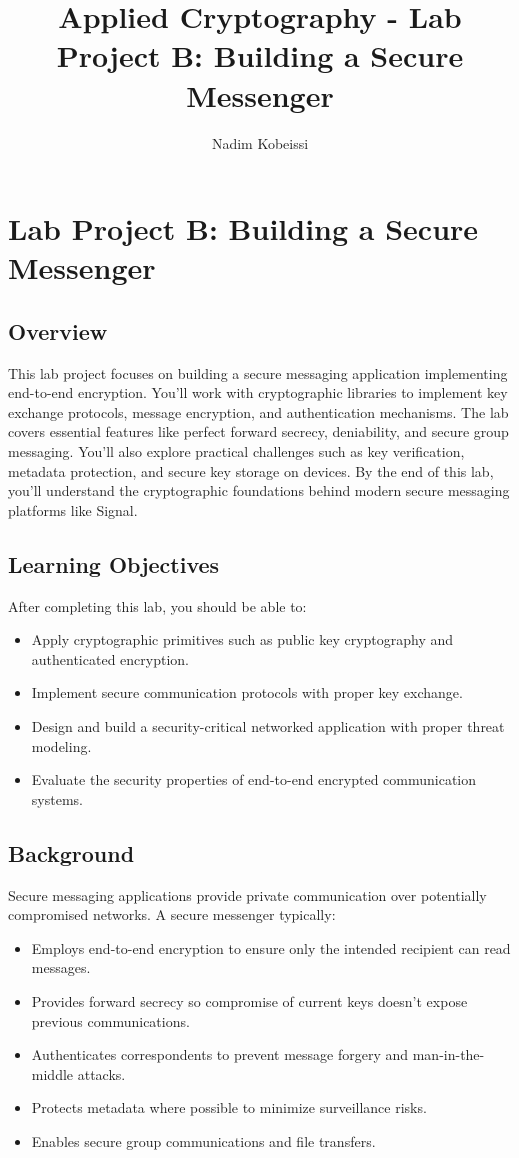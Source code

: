 \documentclass[10pt,a4paper,american]{exam}
\title{Applied Cryptography - Lab Project B: Building a Secure Messenger}
\author{Nadim Kobeissi}
\begin{document}
\classhandoutheader
\section*{Lab Project B: Building a Secure Messenger}

\subsection*{Overview}
This lab project focuses on building a secure messaging application implementing end-to-end encryption. You'll work with cryptographic libraries to implement key exchange protocols, message encryption, and authentication mechanisms. The lab covers essential features like perfect forward secrecy, deniability, and secure group messaging. You'll also explore practical challenges such as key verification, metadata protection, and secure key storage on devices. By the end of this lab, you'll understand the cryptographic foundations behind modern secure messaging platforms like Signal.

\subsection*{Learning Objectives}
After completing this lab, you should be able to:
\begin{itemize}
	\item Apply cryptographic primitives such as public key cryptography and authenticated encryption.
	\item Implement secure communication protocols with proper key exchange.
	\item Design and build a security-critical networked application with proper threat modeling.
	\item Evaluate the security properties of end-to-end encrypted communication systems.
\end{itemize}

\subsection*{Background}
Secure messaging applications provide private communication over potentially compromised networks. A secure messenger typically:
\begin{itemize}
	\item Employs end-to-end encryption to ensure only the intended recipient can read messages.
	\item Provides forward secrecy so compromise of current keys doesn't expose previous communications.
	\item Authenticates correspondents to prevent message forgery and man-in-the-middle attacks.
	\item Protects metadata where possible to minimize surveillance risks.
	\item Enables secure group communications and file transfers.
\end{itemize}
\end{document}
